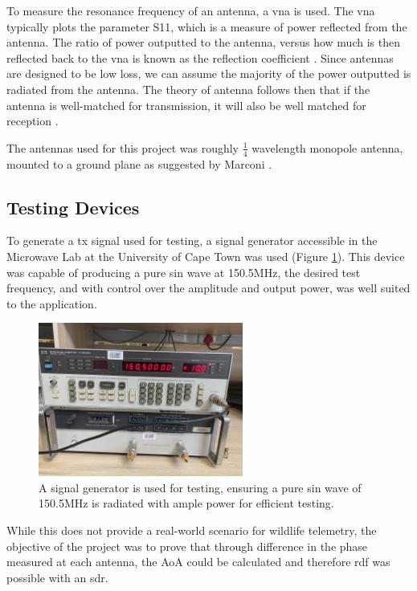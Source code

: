 \documentclass[class=report,11pt,crop=false]{standalone}
\begin{document}
To measure the resonance frequency of an antenna, a \gls{vna} is used. The \gls{vna} typically plots the parameter S11, which is a measure of power reflected from the antenna. The ratio of power outputted to the antenna, versus how much is then reflected back to the \gls{vna} is known as the reflection coefficient \cite{antenna}. Since antennas are designed to be low loss, we can assume the majority of the power outputted is radiated from the antenna. 
The theory of antenna follows then that if the antenna is well-matched for transmission, it will also be well matched for reception \cite{antenna}. 

The antennas used for this project was roughly $\frac{1}{4}$ wavelength monopole antenna, mounted to a ground plane as suggested by Marconi \cite{radio-history}.


\subsection{Testing Devices}
To generate a \gls{tx} signal used for testing, a signal generator accessible in the Microwave Lab at the University of Cape Town was used (Figure \ref{fig:function-gen}). This device was capable of producing a pure sin wave at 150.5MHz, the desired test frequency, and with control over the amplitude and output power, was well suited to the application.

\begin{figure}[h]
    \centering
    \includegraphics[width=0.6\textwidth]{Images/diagrams/signal_gen.jpg}
    \caption{A signal generator is used for testing, ensuring a pure sin wave of 150.5MHz is radiated with ample power for efficient testing.}
    \label{fig:function-gen}
\end{figure}
While this does not provide a real-world scenario for wildlife telemetry, the objective of the project was to prove that through difference in the phase measured at each antenna, the \gls{AoA} could be calculated and therefore \gls{rdf} was possible with an \gls{sdr}.
\end{document}

